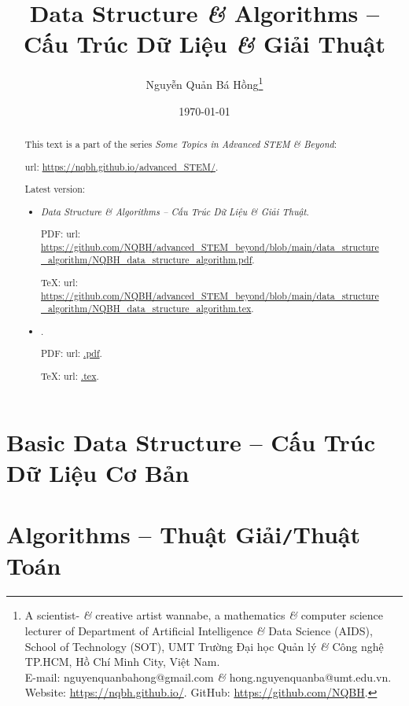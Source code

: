 \documentclass{article}
\title{Data Structure {\it\&} Algorithms -- Cấu Trúc Dữ Liệu {\it\&} Giải Thuật}
\author{Nguyễn Quản Bá Hồng\footnote{A scientist- {\it\&} creative artist wannabe, a mathematics {\it\&} computer science lecturer of Department of Artificial Intelligence {\it\&} Data Science (AIDS), School of Technology (SOT), UMT Trường Đại học Quản lý {\it\&} Công nghệ TP.HCM, Hồ Chí Minh City, Việt Nam.\\E-mail: {\sf nguyenquanbahong@gmail.com} {\it\&} {\sf hong.nguyenquanba@umt.edu.vn}. Website: \url{https://nqbh.github.io/}. GitHub: \url{https://github.com/NQBH}.}}
\date{\today}
\begin{document}
\maketitle
\begin{abstract}
	This text is a part of the series {\it Some Topics in Advanced STEM \& Beyond}:
	
	{\sc url}: \url{https://nqbh.github.io/advanced_STEM/}.
	
	Latest version:
	\begin{itemize}
		\item {\it Data Structure \& Algorithms -- Cấu Trúc Dữ Liệu \& Giải Thuật}.
		
		PDF: {\sc url}: \url{https://github.com/NQBH/advanced_STEM_beyond/blob/main/data_structure_algorithm/NQBH_data_structure_algorithm.pdf}.
		
		\TeX: {\sc url}: \url{https://github.com/NQBH/advanced_STEM_beyond/blob/main/data_structure_algorithm/NQBH_data_structure_algorithm.tex}.
		\item {\it }.
		
		PDF: {\sc url}: \url{.pdf}.
		
		\TeX: {\sc url}: \url{.tex}.
	\end{itemize}
\end{abstract}
\tableofcontents


\section{Basic Data Structure -- Cấu Trúc Dữ Liệu Cơ Bản}


\section{Algorithms -- Thuật Giải{\tt/}Thuật Toán}
\end{document}
